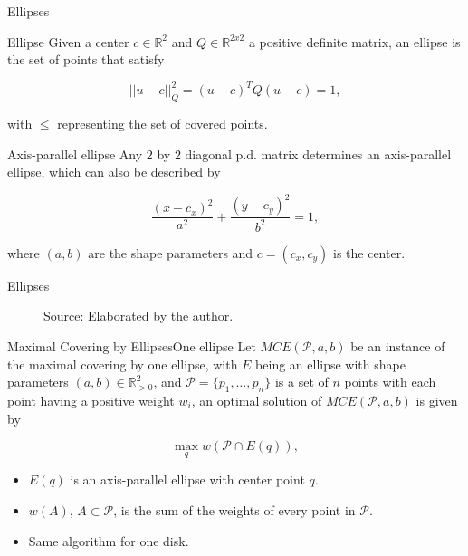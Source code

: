 \documentclass{beamer}
\newcommand{\R}{\mathbb{R}}
\newcommand{\Pp}{\mathscr{P}}
\newcommand{\source}[1]{\caption*{Source: {#1}} }
\begin{document}
\begin{frame}{Ellipses}
	
	\begin{block}{Ellipse}
		Given a center $c \in \R^2$ and $Q \in \R^ {2x2}$ a positive definite matrix, an ellipse is the set of points that satisfy
		
		\begin{equation*}
		||u-c||_Q^2 = (u-c)^TQ(u-c) = 1,
		\end{equation*}
		
		with $\le$ representing the set of covered points.
	\end{block}
	
	\begin{block}{Axis-parallel ellipse}
		Any $2$ by $2$ diagonal p.d. matrix determines an axis-parallel ellipse, which can also be described by
		
		\begin{equation*}
		\frac{(x-c_x)^2}{a^2} + \frac{(y-c_y)^2}{b^2} = 1,
		\end{equation*}
		
		where $(a,b)$ are the shape parameters and $c=(c_x,c_y)$ is the center.
	\end{block}
	
\end{frame}

\begin{frame}{Ellipses}
	\begin{figure}[H]
		\centering
		
		\caption{The ellipse seen as just a linear transformation of a circle.}
		
		\source{Elaborated by the author.}
		\label{fig:3ellipses_intersect}
		
	\end{figure}
\end{frame}



\begin{frame}{Maximal Covering by Ellipses}{One ellipse}
	Let $MCE(\Pp, a, b)$ be an instance of the maximal covering by one ellipse, with $E$ being an ellipse with shape parameters $(a,b) \in \R_{>0}^2$, and $\Pp=\{p_1,\dots,p_n\}$ is a set of $n$ points with each point having a positive weight $w_i$, an optimal solution of $MCE(\Pp, a, b)$ is given by
	
	\begin{equation*}
	\max_q w(\Pp \cap E(q)),
	\end{equation*}

	\begin{itemize}
		\item $E(q)$ is an axis-parallel ellipse with center point $q$.
		\item $w(A)$, $A \subset \Pp$, is the sum of the weights of every point in $\Pp$.
		\item Same algorithm for one disk.
	\end{itemize}

\end{frame}
\end{document}
